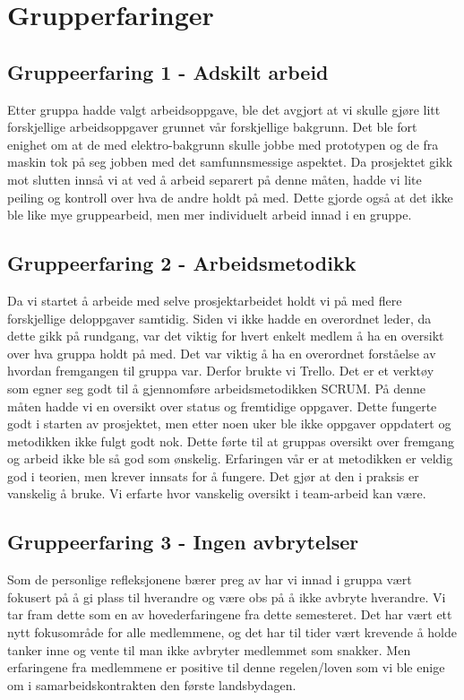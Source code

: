 \chapter{Grupperfaringer}


\section{Gruppeerfaring 1 - Adskilt arbeid}

Etter gruppa hadde valgt arbeidsoppgave, ble det avgjort at vi skulle gjøre litt forskjellige arbeidsoppgaver grunnet vår forskjellige bakgrunn. Det ble fort enighet om at de med elektro-bakgrunn skulle jobbe med prototypen og de fra maskin tok på seg jobben med det samfunnsmessige aspektet. Da prosjektet gikk mot slutten innså vi at ved å arbeid separert på denne måten, hadde vi lite peiling og kontroll over hva de andre holdt på med. Dette gjorde også at det ikke ble like mye gruppearbeid, men mer individuelt arbeid innad i en gruppe.

\section{Gruppeerfaring 2 - Arbeidsmetodikk}

Da vi startet å arbeide med selve prosjektarbeidet holdt vi på med flere forskjellige deloppgaver samtidig. Siden vi ikke hadde en overordnet leder, da dette gikk på rundgang, var det viktig for hvert enkelt medlem å ha en oversikt over hva gruppa holdt på med. Det var viktig å ha en overordnet forståelse av hvordan fremgangen til gruppa var. Derfor brukte vi Trello. Det er et verktøy som egner seg godt til å gjennomføre arbeidsmetodikken SCRUM. På denne måten hadde vi en oversikt over status og fremtidige oppgaver. Dette fungerte godt i starten av prosjektet, men etter noen uker ble ikke oppgaver oppdatert og metodikken ikke fulgt godt nok. Dette førte til at gruppas oversikt over fremgang og arbeid ikke ble så god som ønskelig. Erfaringen vår er at metodikken er veldig god i teorien, men krever innsats for å fungere. Det gjør at den i praksis er vanskelig å bruke. Vi erfarte hvor vanskelig oversikt i team-arbeid kan være.

\section{Gruppeerfaring 3 - Ingen avbrytelser}

Som de personlige refleksjonene bærer preg av har vi innad i gruppa vært fokusert på å gi plass til hverandre og være obs på å ikke avbryte hverandre. Vi tar fram dette som en av hovederfaringene fra dette semesteret. Det har vært ett nytt fokusområde for alle medlemmene, og det har til tider vært krevende å holde tanker inne og vente til man ikke avbryter medlemmet som snakker. Men erfaringene fra medlemmene er positive til denne regelen/loven som vi ble enige om i samarbeidskontrakten den første landsbydagen. 